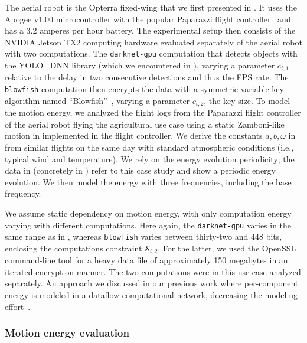 The aerial robot is the Opterra fixed-wing that we first presented in . It uses the Apogee v1.00 microcontroller with the popular Paparazzi flight controller~\citep{papa} and has a 3.2 amperes per hour battery. The experimental setup then consists of the NVIDIA Jetson TX2 computing hardware evaluated separately of the aerial robot with two computations. The {\small\tt darknet-gpu} computation that detects objects with the YOLO~\citep{redmon2016you} DNN library (which we encountered in ), varying a parameter $c_{i,1}$ relative to the delay in two consecutive detections and thus the FPS rate. The {\small\tt blowfish} computation then encrypts the data with a symmetric variable key algorithm named ``Blowfish''~\citep{schneier1993description}, varying a parameter $c_{i,2}$, the key-size. To model the motion energy, we analyzed the flight logs from the Paparazzi flight controller of the aerial robot flying the agricultural use case using a static Zamboni-like motion in  implemented in the flight controller. We derive the constants $a,b,\omega$ in  from similar flights on the same day with standard atmospheric conditions (i.e., typical wind and temperature). We rely on the energy evolution periodicity; the data in  (concretely in ) refer to this case study and show a periodic energy evolution. We then model the energy with three frequencies, including the base frequency.

We assume static dependency on motion energy, with only computation energy varying with different computations. Here again, the {\small\tt darknet-gpu} varies in the same range as in , whereas {\small\tt blowfish} varies between thirty-two and 448 bits, enclosing the computations constraint $\mathcal{S}_{i,2}$. For the latter, we used the OpenSSL~\citep{viega2002network} command-line tool for a heavy data file of approximately 150 megabytes in an iterated encryption manner. The two computations were in this use case analyzed separately. An approach we discussed in our previous work where per-component energy is modeled in a dataflow computational network, decreasing the modeling effort~\citep{seewald2019component}.

\subsubsection*{Motion energy evaluation}

